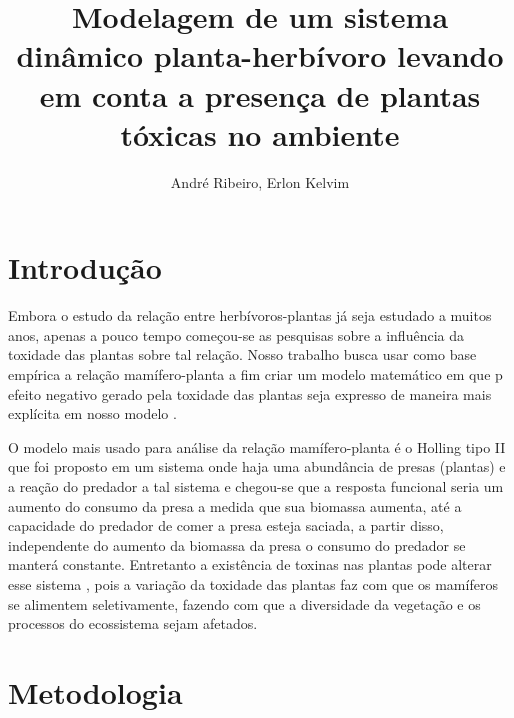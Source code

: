 \documentclass{article}
\title{Modelagem de um sistema dinâmico planta-herbívoro levando em conta a presença de plantas tóxicas no ambiente}
\author{André Ribeiro, Erlon Kelvim}
\begin{document}
\maketitle

\section{Introdução}

Embora o estudo da relação entre herbívoros-plantas já seja estudado a muitos anos, apenas a pouco tempo começou-se as pesquisas sobre a influência da toxidade das plantas sobre tal relação. Nosso trabalho busca usar como base empírica a relação mamífero-planta a fim criar um modelo matemático em que p efeito negativo gerado pela toxidade das plantas seja expresso de maneira mais explícita em nosso modelo \cite{LI} \cite{FENG}.

O modelo mais usado para análise da relação mamífero-planta é o Holling tipo II \cite{CRAWFORD}\cite{HOLLING} que foi proposto em um sistema onde haja uma abundância de presas (plantas) e a reação do predador a tal sistema e chegou-se que a resposta funcional seria um aumento do consumo da presa a medida que sua biomassa aumenta, até a capacidade do predador de comer a presa esteja saciada, a partir disso, independente do aumento da biomassa da presa o consumo do predador se manterá constante. Entretanto a existência de toxinas nas plantas pode alterar esse sistema \cite{ZHILAN}, pois a variação da toxidade das plantas faz com que os mamíferos se alimentem seletivamente, fazendo com que a diversidade da vegetação e os processos do ecossistema sejam afetados.


\section{Metodologia}
\end{document}
